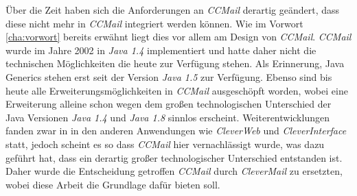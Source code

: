 Über die Zeit haben sich die Anforderungen an \emph{CCMail} derartig geändert, dass diese nicht mehr in \emph{CCMail} integriert werden können. Wie im Vorwort \ref{cha:vorwort} bereits erwähnt liegt dies vor allem am Design von \emph{CCMail}. \emph{CCMail} wurde im Jahre 2002 in \emph{Java 1.4} implementiert und hatte daher nicht die technischen Möglichkeiten die heute zur Verfügung stehen. Als Erinnerung, Java Generics stehen erst seit der Version \emph{Java 1.5} zur Verfügung. Ebenso sind bis heute alle Erweiterungsmöglichkeiten in \emph{CCMail} ausgeschöpft worden, wobei eine Erweiterung alleine schon wegen dem großen technologischen Unterschied der Java Versionen \emph{Java 1.4} und \emph{Java 1.8} sinnlos erscheint. Weiterentwicklungen fanden zwar in in den anderen Anwendungen wie \emph{CleverWeb} und \emph{CleverInterface} statt, jedoch scheint es so dass \emph{CCMail} hier vernachlässigt wurde, was dazu geführt hat, dass ein derartig großer technologischer Unterschied entstanden ist. 
\newline
\newline
Daher wurde die Entscheidung getroffen \emph{CCMail} durch \emph{CleverMail} zu ersetzten, wobei diese Arbeit die Grundlage dafür bieten soll.